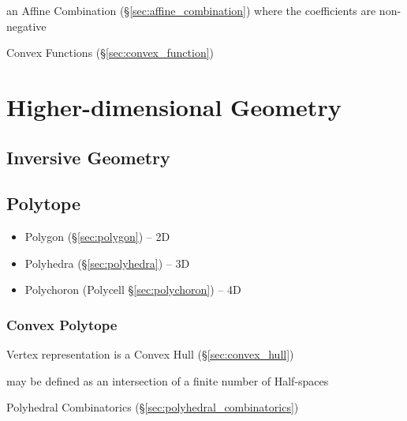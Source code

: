 an Affine Combination (\S\ref{sec:affine_combination}) where the coefficients
are non-negative

\fist Convex Functions (\S\ref{sec:convex_function})



\section{Higher-dimensional Geometry}\label{sec:higher_geometry}

\subsection{Inversive Geometry}\label{sec:inversive_geometry}

\subsection{Polytope}\label{sec:polytope}

\begin{itemize}
  \item Polygon (\S\ref{sec:polygon}) -- 2D
  \item Polyhedra (\S\ref{sec:polyhedra}) -- 3D
  \item Polychoron (Polycell \S\ref{sec:polychoron}) -- 4D
\end{itemize}



\subsubsection{Convex Polytope}\label{sec:convex_polytope}

Vertex representation is a Convex Hull (\S\ref{sec:convex_hull})

may be defined as an intersection of a finite number of Half-spaces

\fist Polyhedral Combinatorics (\S\ref{sec:polyhedral_combinatorics})



